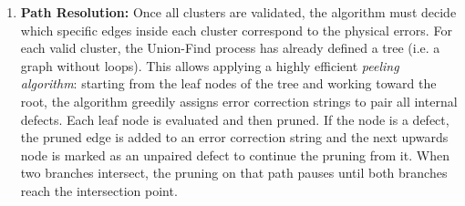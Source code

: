 \begin{enumerate}
    \item {} \textbf{Path Resolution:} Once all clusters are validated, the algorithm must decide which specific edges inside each cluster correspond to the physical errors. For each valid cluster, the Union-Find process has already defined a tree (i.e. a graph without loops). This allows applying a highly efficient \textit{peeling algorithm}: starting from the leaf nodes of the tree and working toward the root, the algorithm greedily assigns error correction strings to pair all internal defects. Each leaf node is evaluated and then pruned. If the node is a defect, the pruned edge is added to an error correction string and the next upwards node is marked as an unpaired defect to continue the pruning from it. When two branches intersect, the pruning on that path pauses until both branches reach the intersection point.
\end{enumerate}

